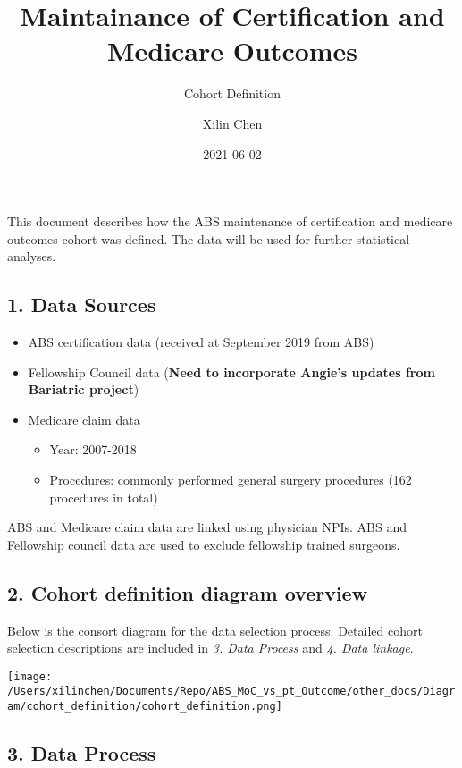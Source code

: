 \documentclass[
]{article}
\title{Maintainance of Certification and Medicare Outcomes}
\subtitle{Cohort Definition}
\author{Xilin Chen}
\date{2021-06-02}
\providecommand{\tightlist}{%
  \setlength{\itemsep}{0pt}\setlength{\parskip}{0pt}}
\begin{document}
\maketitle

{
\setcounter{tocdepth}{3}
\tableofcontents
}
This document describes how the ABS maintenance of certification and
medicare outcomes cohort was defined. The data will be used for further
statistical analyses.

\hypertarget{data-sources}{%
\subsection{1. Data Sources}\label{data-sources}}

\begin{itemize}
\tightlist
\item
  ABS certification data (received at September 2019 from ABS)
\item
  Fellowship Council data (\textbf{Need to incorporate Angie's updates
  from Bariatric project})
\item
  Medicare claim data

  \begin{itemize}
  \tightlist
  \item
    Year: 2007-2018
  \item
    Procedures: commonly performed general surgery procedures (162
    procedures in total)
  \end{itemize}
\end{itemize}

ABS and Medicare claim data are linked using physician NPIs. ABS and
Fellowship council data are used to exclude fellowship trained surgeons.

\pagebreak

\hypertarget{cohort-definition-diagram-overview}{%
\subsection{2. Cohort definition diagram
overview}\label{cohort-definition-diagram-overview}}

Below is the consort diagram for the data selection process. Detailed
cohort selection descriptions are included in \emph{3. Data Process} and
\emph{4. Data linkage}.

\texttt{[image: /Users/xilinchen/Documents/Repo/ABS\_MoC\_vs\_pt\_Outcome/other\_docs/Diagram/cohort\_definition/cohort\_definition.png]}

\hypertarget{data-process}{%
\subsection{3. Data Process}\label{data-process}}
\end{document}
